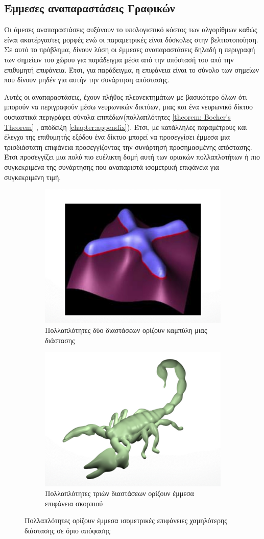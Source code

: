 \subsection{Έμμεσες αναπαραστάσεις Γραφικών}
\par
    Οι άμεσες αναπαραστάσεις αυξάνουν το υπολογιστικό κόστος των αλγορίθμων καθώς είναι ακατέργαστες μορφές ενώ οι  παραμετρικές είναι δύσκολες στην βελτιστοποίηση. Σε αυτό το πρόβλημα, δίνουν λύση οι έμμεσες αναπαραστάσεις δηλαδή η περιγραφή των σημείων του χώρου για παράδειγμα μέσα από την απόστασή του από την επιθυμητή επιφάνεια. Έτσι, για παράδειγμα, η επιφάνεια είναι το σύνολο των σημείων που δίνουν μηδέν για αυτήν την συνάρτηση απόστασης.
\par 
    Αυτές οι αναπαραστάσεις, έχουν πλήθος πλεονεκτημάτων με βασικότερο όλων ότι μπορούν να περιγραφούν μέσω νευρωνικών δικτύων, μιας και ένα νευρωνικό δίκτυο ουσιαστικά περιγράφει σύνολα επιπέδων(πολλαπλότητες \ref{theorem: Bocher's Theorem} , απόδειξη \ref{chapter:appendix}). Έτσι, με κατάλληλες παραμέτρους και έλεγχο της επιθυμητής εξόδου ένα δίκτυο μπορεί να προσεγγίσει έμμεσα μια τρισδιάστατη επιφάνεια προσεγγίζοντας την συνάρτησή προσημασμένης απόστασης. Έτσι προσεγγίζει μια πολύ πιο ευέλικτη δομή αυτή των οριακών πολλαπλοτήτων ή πιο συγκεκριμένα της συνάρτησης που αναπαριστά ισομετρική επιφάνεια για συγκεκριμένη τιμή.
    \begin{figure}[H]
    \begin{subfigure}{.47\textwidth}
        \centering
        \includegraphics[width=.5\textwidth]{images/chapter2_img/levelSetOf2DDefines1dline.jpg}\\
        \small{Πολλαπλότητες δύο διαστάσεων ορίζουν καμπύλη μιας διάστασης}
    \end{subfigure}
    \hfill
    \begin{subfigure}{.47\textwidth}
        \centering
        \includegraphics[width=.5\textwidth]{images/chapter2_img/levelSetOf3DDefines2dSuraface.jpg}\\
        \small{Πολλαπλότητες τριών διαστάσεων ορίζουν έμμεσα επιφάνεια σκορπιού}
    \end{subfigure}
    \caption{Πολλαπλότητες ορίζουν έμμεσα ισομετρικές επιφάνειες χαμηλότερης διάστασης σε όριο απόφασης}
    \end{figure}
